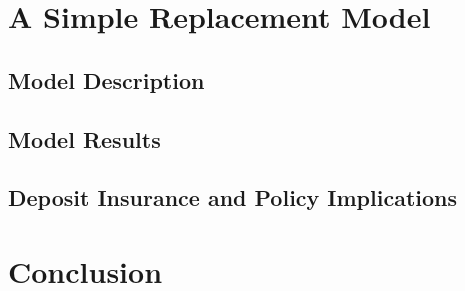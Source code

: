 \documentclass[12pt]{article}
\begin{document}
\begin{doublespace}

\section{A Simple Replacement Model}
\subsection{Model Description}
\subsection{Model Results}

\subsection{Deposit Insurance and Policy Implications}

\section{Conclusion}
\end{doublespace}


\end{document}
